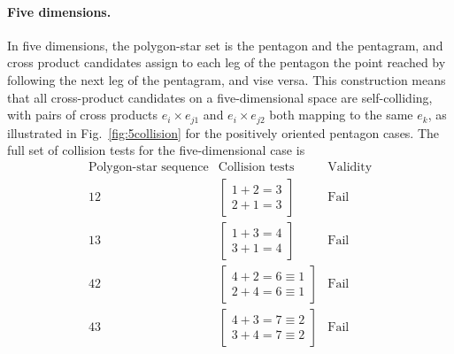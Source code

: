 \documentclass[11pt]{article}
\newcommand{\bv}[1][]{e_{#1}}
\begin{document}
\paragraph{Five dimensions.}
In five dimensions, the polygon-star set is the pentagon and the pentagram, and cross product candidates assign to each leg of the pentagon the point reached by following the next leg of the pentagram, and vise versa. This construction means that all cross-product candidates on a five-dimensional space are self-colliding, with pairs of cross products $\bv[i]\times\bv[j1]$ and $\bv[i]\times\bv[j2]$ both mapping to the same $\bv[k]$, as illustrated in Fig.~\ref{fig:5collision} for the positively oriented pentagon cases. The full set of collision tests for the five-dimensional case is
%
\begin{equation}
\begin{array}{c|c|c}
\text{Polygon-star sequence} & \text{Collision tests} & \text{Validity} \\\hline\hline
12 & \begin{bmatrix}1+2= 3 \\ 2+1=3 \end{bmatrix} & \text{Fail} \\
13 & \begin{bmatrix}1+3= 4 \\ 3+1=4 \end{bmatrix} &  \text{Fail} \\
42 & \begin{bmatrix}4+2= 6\equiv{1} \\ 2+4=6\equiv{1} \end{bmatrix} & \text{Fail} \\
43 & \begin{bmatrix}4+3= 7\equiv{2} \\ 3+4=7\equiv{2} \end{bmatrix} &  \text{Fail} \\
\end{array}
\end{equation}
\end{document}
